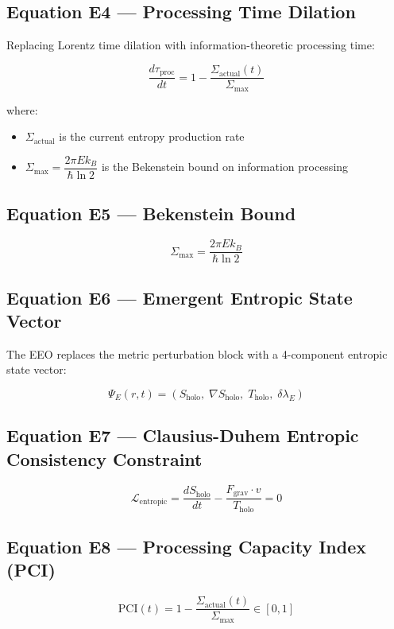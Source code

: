 \subsection{Equation E4 — Processing Time Dilation}

Replacing Lorentz time dilation with information-theoretic processing time:

\[
\frac{d\tau_{\text{proc}}}{dt} = 1 - \frac{\Sigma_{\text{actual}}(t)}{\Sigma_{\text{max}}}
\]

where:
\begin{itemize}
    \item $\Sigma_{\text{actual}}$ is the current entropy production rate
    \item $\Sigma_{\text{max}} = \dfrac{2\pi E k_B}{\hbar \ln 2}$ is the Bekenstein bound on information processing
\end{itemize}

\subsection{Equation E5 — Bekenstein Bound}

\[
\Sigma_{\text{max}} = \frac{2\pi E k_B}{\hbar \ln 2}
\]

\subsection{Equation E6 — Emergent Entropic State Vector}

The EEO replaces the metric perturbation block with a 4-component entropic state vector:

\[
\Psi_E(r,t) = \left( S_{\text{holo}},\; \nabla S_{\text{holo}},\; T_{\text{holo}},\; \delta\lambda_E \right)
\]

\subsection{Equation E7 — Clausius-Duhem Entropic Consistency Constraint}

\[
\mathcal{L}_{\text{entropic}} = \frac{dS_{\text{holo}}}{dt} - \frac{F_{\text{grav}} \cdot v}{T_{\text{holo}}} = 0
\]

\subsection{Equation E8 — Processing Capacity Index (PCI)}

\[
\text{PCI}(t) = 1 - \frac{\Sigma_{\text{actual}}(t)}{\Sigma_{\text{max}}} \in [0,1]
\]

